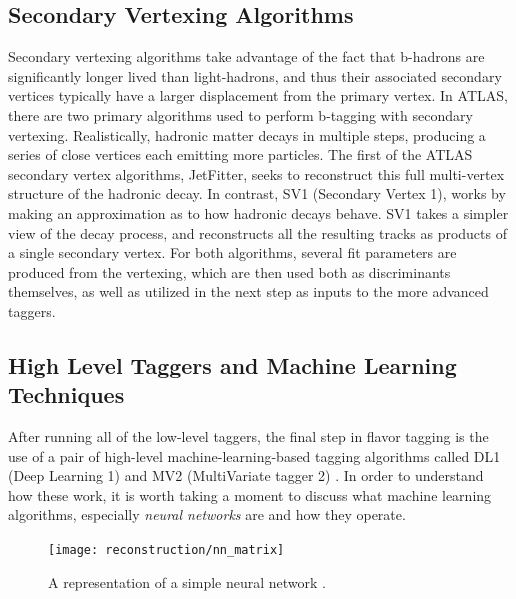             


        \FloatBarrier
        \subsection{Secondary Vertexing Algorithms}

            Secondary vertexing algorithms take advantage of the fact that b-hadrons are significantly longer lived than light-hadrons,
                and thus their associated secondary vertices typically have a larger displacement from the primary vertex.
            In ATLAS, there are two primary algorithms used to perform b-tagging with secondary vertexing.
            Realistically, hadronic matter decays in multiple steps, producing a series of close vertices each emitting more particles.
            The first of the ATLAS secondary vertex algorithms, JetFitter, seeks to reconstruct this full multi-vertex structure of the hadronic decay.
            In contrast, SV1 (Secondary Vertex 1), works by making an approximation as to how hadronic decays behave.
            SV1 takes a simpler view of the decay process, and reconstructs all the resulting tracks as products of a single secondary vertex.
            For both algorithms, several fit parameters are produced from the vertexing,
                which are then used both as discriminants themselves,
                as well as utilized in the next step as inputs to the more advanced taggers\cite{btagging_optimisation}.

        \FloatBarrier
        \subsection{High Level Taggers and Machine Learning Techniques}\label{sec:ml_techniques}

            After running all of the low-level taggers,
                the final step in flavor tagging is the use of a pair of high-level machine-learning-based tagging algorithms
                called DL1 (Deep Learning 1) and MV2 (MultiVariate tagger 2)
                \cite{bjet_id_and_performance} \cite{btagging_optimisation}.
            In order to understand how these work, it is worth taking a moment to discuss what machine learning algorithms,
                especially \textit{neural networks} are and how they operate.

            \begin{figure}[tbh] \center
                \texttt{[image: reconstruction/nn\_matrix]}
                \caption{
                    A representation of a simple neural network \cite{intro_to_neural_networks}.
                }
                \label{fig:nn_matrix}
            \end{figure}


